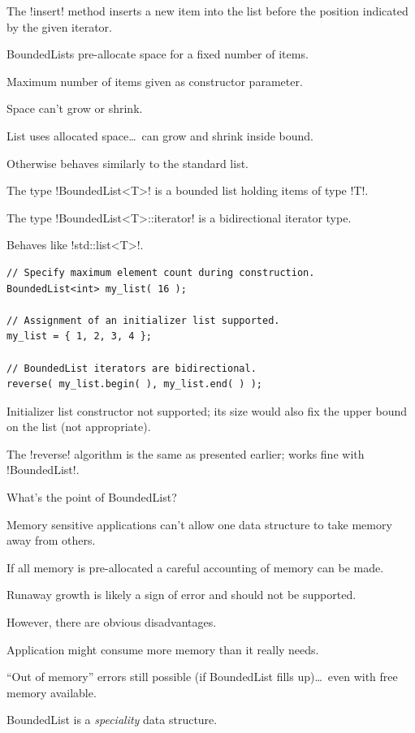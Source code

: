 \documentclass[landscape]{slides}
\begin{document}
The !insert! method inserts a new item into the list before the position indicated by the given
iterator.
\stopslide


BoundedLists pre-allocate space for a fixed number of items.
\begin{citemize}
\item Maximum number of items given as constructor parameter.
\item Space can't grow or shrink.
\item List uses allocated space\ldots\ can grow and shrink inside bound.
\item Otherwise behaves similarly to the standard list.
\end{citemize}
The type !BoundedList<T>! is a bounded list holding items of type !T!.

The type !BoundedList<T>::iterator! is a bidirectional iterator type.
\stopslide


Behaves like !std::list<T>!.
\vspace{5mm}
{\small
\begin{lstlisting}
// Specify maximum element count during construction.
BoundedList<int> my_list( 16 );

// Assignment of an initializer list supported.
my_list = { 1, 2, 3, 4 };

// BoundedList iterators are bidirectional.
reverse( my_list.begin( ), my_list.end( ) );
\end{lstlisting}
}

Initializer list constructor not supported; its size would also fix the upper bound on the list
(not appropriate).

The !reverse! algorithm is the same as presented earlier; works fine with !BoundedList!.
\stopslide


What's the point of BoundedList?
\begin{citemize}
\item Memory sensitive applications can't allow one data structure to take memory away from
  others.
\item If all memory is pre-allocated a careful accounting of memory can be made.
\item Runaway growth is likely a sign of error and should not be supported.
\end{citemize}
However, there are obvious disadvantages.
\begin{citemize}
\item Application might consume more memory than it really needs.
\item ``Out of memory'' errors still possible (if BoundedList fills up)\ldots\ even with free
  memory available.
\end{citemize}
BoundedList is a \emph{speciality} data structure.
\stopslide
\end{document}
